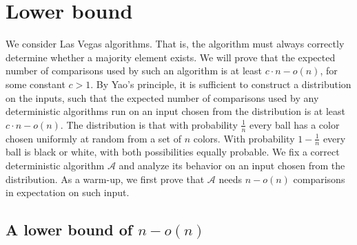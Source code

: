 \documentclass{article}[11pt,a4paper]
\begin{document}
\section{Lower bound}

We consider Las Vegas algorithms. That is, the algorithm must always correctly determine whether
a majority element exists.  We will prove that the expected number of comparisons used by such
an algorithm is at least $c\cdot n-o(n)$, for some constant $c > 1$.
By Yao's principle, it is sufficient to construct a distribution on the inputs,
such that the expected number of comparisons used by any deterministic algorithms run on an input
chosen from the distribution is at least $c\cdot n-o(n)$.
The distribution is that with probability $\frac{1}{n}$ every ball has a color chosen uniformly at random
from a set of $n$ colors. With probability $1-\frac{1}{n}$ every ball is black or white,
with both possibilities equally probable. We fix a correct deterministic algorithm $\mathcal{A}$ and
analyze its behavior on an input chosen from the distribution. As a warm-up, we
first prove that $\mathcal{A}$ needs $n-o(n)$ comparisons in expectation on such input.

\subsection{A lower bound of \texorpdfstring{\boldmath $n - o(n)$}{n - o(n)}}
\end{document}
